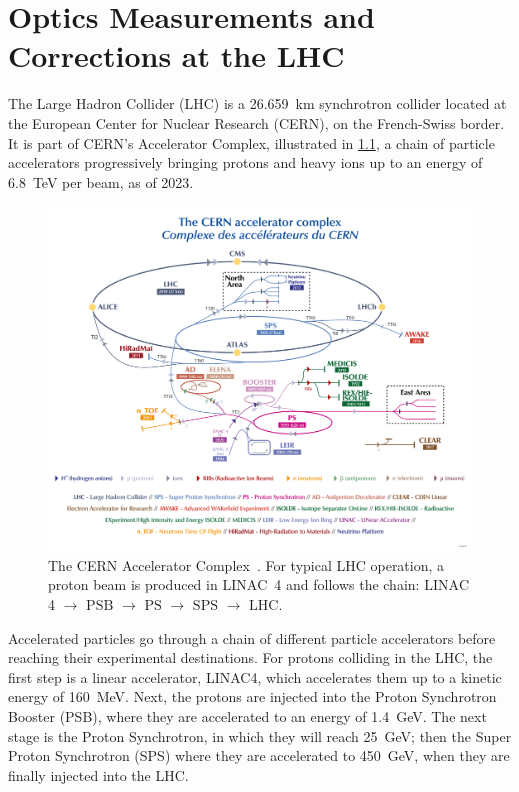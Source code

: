\chapter{Optics Measurements and Corrections at the LHC}
\label{Chapter:LHC_OMC} %

The Large Hadron Collider (LHC) is a \qty{26.659}{\kilo\metre} synchrotron collider located at the European Center for Nuclear Research (CERN), on the French-Swiss border.
It is part of CERN's Accelerator Complex, illustrated in \cref{figure:cern_accelerator_complex}, a chain of particle accelerators progressively bringing protons and heavy ions up to an energy of \qty{6.8}{\tera\electronvolt} per beam, as of \num{2023}.

\begin{figure}[!htb]
  \centering
  \includegraphics*[width=0.9\linewidth]{Figures/Chapter3/cern_accelerator_complex.png}
  \caption{The CERN Accelerator Complex~\cite{Website:CERN_Accelerator_Complex_Resource}. For typical LHC operation, a proton beam is produced in \(\mathrm{LINAC}\)~\num{4} and follows the chain: \(\mathrm{LINAC}\)\num{4} \(\rightarrow\) \(\mathrm{PSB}\) \(\rightarrow\) \(\mathrm{PS}\) \(\rightarrow\) \(\mathrm{SPS}\) \(\rightarrow\) \(\mathrm{LHC}\).}
  \label{figure:cern_accelerator_complex}
\end{figure}

Accelerated particles go through a chain of different particle accelerators before reaching their experimental destinations.
For protons colliding in the LHC, the first step is a linear accelerator, LINAC\num{4}, which accelerates them up to a kinetic energy of \qty{160}{\mega\electronvolt}.
Next, the protons are injected into the Proton Synchrotron Booster (PSB), where they are accelerated to an energy of \qty{1.4}{\giga\electronvolt}.
The next stage is the Proton Synchrotron, in which they will reach \qty{25}{\giga\electronvolt}; then the Super Proton Synchrotron (SPS) where they are accelerated to \qty{450}{\giga\electronvolt}, when they are finally injected into the LHC.

